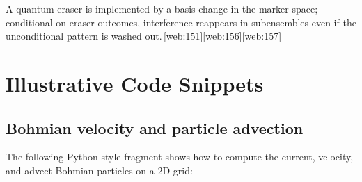 \documentclass[11pt]{article}
\begin{document}
A quantum eraser is implemented by a basis change in the marker space; conditional on eraser outcomes, interference reappears in subensembles even if the unconditional pattern is washed out.\,[web:151][web:156][web:157]

\section{Illustrative Code Snippets}

\subsection{Bohmian velocity and particle advection}

The following Python-style fragment shows how to compute the current, velocity, and advect Bohmian particles on a 2D grid:
\end{document}
